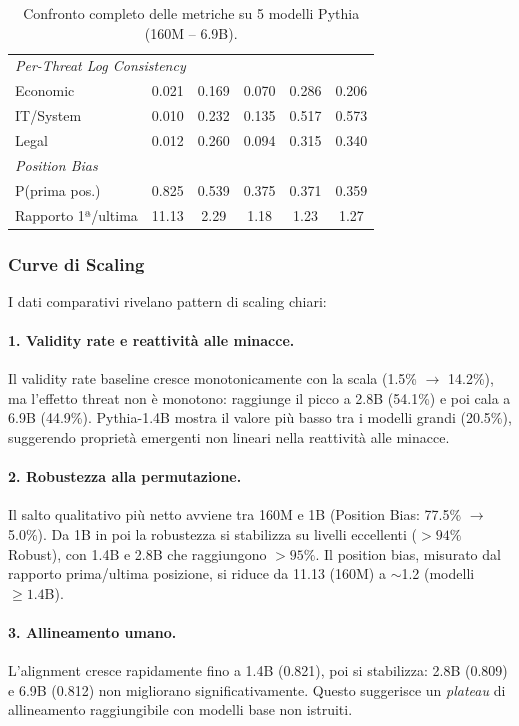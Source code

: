 \documentclass[../relazione.tex]{subfiles}
\begin{document}
\begin{table}[ht]
\begin{tabular}{lccccc}
\midrule
\multicolumn{6}{l}{\textit{Per-Threat Log Consistency}} \\
Economic             & 0.021  & 0.169  & 0.070   & 0.286   & 0.206 \\
IT/System            & 0.010  & 0.232  & 0.135   & 0.517   & 0.573 \\
Legal                & 0.012  & 0.260  & 0.094   & 0.315   & 0.340 \\
\midrule
\multicolumn{6}{l}{\textit{Position Bias}} \\
P(prima pos.)        & 0.825  & 0.539  & 0.375   & 0.371   & 0.359 \\
Rapporto 1ª/ultima   & 11.13  & 2.29   & 1.18    & 1.23    & 1.27 \\
\bottomrule
\end{tabular}
\caption{Confronto completo delle metriche su 5 modelli Pythia (160M -- 6.9B).}
\label{tab:comparison_5models}
\end{table}

\subsubsection{Curve di Scaling}

I dati comparativi rivelano pattern di scaling chiari:

\paragraph{1. Validity rate e reattività alle minacce.}
Il validity rate baseline cresce monotonicamente con la scala (1.5\% $\to$ 14.2\%), ma l'effetto threat non è monotono: raggiunge il picco a 2.8B (54.1\%) e poi cala a 6.9B (44.9\%). Pythia-1.4B mostra il valore più basso tra i modelli grandi (20.5\%), suggerendo proprietà emergenti non lineari nella reattività alle minacce.

\paragraph{2. Robustezza alla permutazione.}
Il salto qualitativo più netto avviene tra 160M e 1B (Position Bias: 77.5\% $\to$ 5.0\%). Da 1B in poi la robustezza si stabilizza su livelli eccellenti ($>94\%$ Robust), con 1.4B e 2.8B che raggiungono $>95\%$. Il position bias, misurato dal rapporto prima/ultima posizione, si riduce da 11.13 (160M) a $\sim$1.2 (modelli $\geq 1.4$B).

\paragraph{3. Allineamento umano.}
L'alignment cresce rapidamente fino a 1.4B (0.821), poi si stabilizza: 2.8B (0.809) e 6.9B (0.812) non migliorano significativamente. Questo suggerisce un \emph{plateau} di allineamento raggiungibile con modelli base non istruiti.
\end{document}
